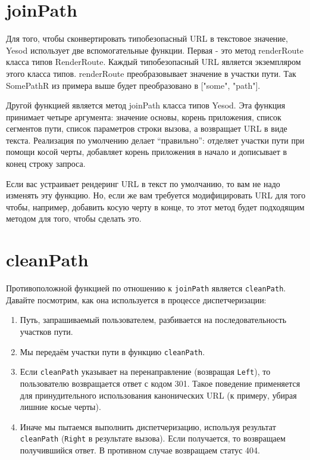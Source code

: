 \section {joinPath}

Для того, чтобы сконвертировать типобезопасный URL в текстовое значение, Yesod использует две вспомогательные функции. Первая - это метод renderRoute класса типов RenderRoute. Каждый типобезопасный URL является экземпляром этого класса типов. renderRoute преобразовывает значение в участки пути. Так SomePathR из примера выше будет преобразовано в ["some", "path"].


Другой функцией является метод joinPath класса типов Yesod. Эта функция принимает четыре аргумента: значение основы, корень приложения, список сегментов пути, список параметров строки вызова, а возвращает URL в виде текста. Реализация по умолчению делает ``правильно'': отделяет участки пути при помощи косой черты, добавляет корень приложения в начало и дописывает в конец строку запроса.

Если вас устраивает рендеринг URL в текст по умолчанию, то вам не надо изменять эту функцию. Но, если же вам требуется модифицировать URL для того чтобы, например, добавить косую черту в конце, то этот метод будет подходящим методом для того, чтобы сделать это.

\section {cleanPath}

Противоположной функцией по отношению к \lstinline!joinPath! является \lstinline!cleanPath!. Давайте посмотрим, как она используется в процессе диспетчеризации:

\begin{enumerate}
  \item Путь, запрашиваемый пользователем, разбивается на последовательность участков пути.
  \item Мы передаём участки пути в функцию \lstinline!cleanPath!.
  \item Если \lstinline!cleanPath! указывает на перенаправление (возвращая \lstinline!Left!), то пользователю возвращается ответ с кодом 301. Такое поведение применяется для принудительного использования канонических URL (к примеру, убирая лишние косые черты).
  \item Иначе мы пытаемся выполнить диспетчеризацию, используя результат \lstinline!cleanPath! (\lstinline!Right! в результате вызова). Если получается, то возвращаем получившийся ответ. В противном случае возвращаем статус 404.
\end{enumerate}

